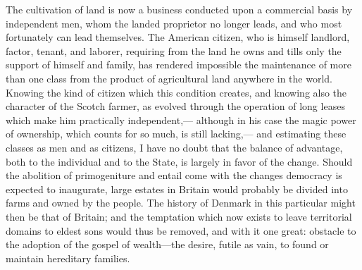 \documentclass[11pt,openany]{book}
\begin{document}
The cultivation of land is now a business conducted upon a commercial basis by independent men, whom the landed proprietor no longer leads, and who most fortunately can lead themselves. The American citizen, who is himself landlord, factor, tenant, and laborer, requiring from the land he owns and tills only the support of himself and family, has rendered impossible the maintenance of more than one class from the product of agricultural land anywhere in the world. Knowing the kind of citizen which this condition creates, and knowing also the character of the Scotch farmer, as evolved through the operation of long leases which make him practically independent,--- although in his case the magic power of ownership, which counts for so much, is still lacking,--- and estimating these classes as men and as citizens, I have no doubt that the balance of advantage, both to the individual and to the State, is largely in favor of the change. Should the abolition of primogeniture and entail come with the changes democracy is expected to inaugurate, large estates in Britain would probably be divided into farms and owned by the people. The history of Denmark in this particular might then be that of Britain; and the temptation which now exists to leave territorial domains to eldest sons would thus be removed, and with it one great: obstacle to the adoption of the gospel of wealth---the desire, futile as vain, to found or maintain hereditary families.
\end{document}
